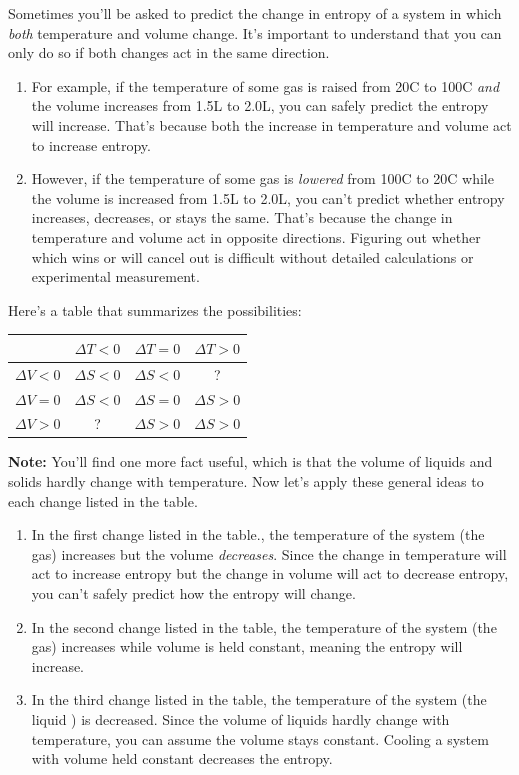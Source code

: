 \documentclass{article}  %
\begin{document}
Sometimes you'll be asked to predict the change in entropy of a system in which \emph{both} temperature and volume change. It's important to understand that you can only do so if both changes act in the same direction.
\begin{enumerate}
    \item For example, if the temperature of some  gas is raised from 20C to 100C \emph{and} the volume increases from 1.5L to 2.0L, you can safely predict the entropy will increase. That's because both the increase in temperature and volume act to increase entropy. 
    \item However, if the temperature of some  gas is \emph{lowered} from 100C to 20C while the volume is increased from 1.5L to 2.0L, you can't predict whether entropy increases, decreases, or stays the same. That's because the change in temperature and volume act in opposite directions. Figuring out whether which wins or will cancel out is difficult without detailed calculations or experimental measurement. 
\end{enumerate}
Here's a table that summarizes the possibilities:
\begin{center}
    \begin{tabular}{c | c | c | c |}
        & $\Delta T < 0$ & $\Delta T = 0$ & $\Delta T > 0$\\
        \hline
        $\Delta V < 0$ & $\Delta S < 0$ & $\Delta S < 0$ & ? \\
        \hline
        $\Delta V = 0$ & $\Delta S < 0$ & $\Delta S = 0$ & $\Delta S > 0$ \\
        \hline
        $\Delta V > 0$ & ? & $\Delta S > 0$ & $\Delta S > 0$ \\
        \hline
    \end{tabular}
\end{center}
\textbf{Note:} You'll find one more fact useful, which is that the volume of liquids and solids hardly change with temperature. 
\newline
Now let's apply these general ideas to each change listed in the table.
\begin{enumerate}
    \item In the first change listed in the table., the temperature of the system (the  gas) increases but the volume \emph{decreases}. Since the change in temperature will act to increase entropy but the change in volume will act to decrease entropy, you can't safely predict how the entropy will change.
    \item In the second change listed in the table, the temperature of the system (the  gas) increases while volume is held constant, meaning the entropy will increase. 
    \item In the third change listed in the table, the temperature of the system (the liquid ) is decreased. Since the volume of liquids hardly change with temperature, you can assume the volume stays constant. Cooling a system with volume held constant decreases the entropy.
\end{enumerate}
\end{document}
